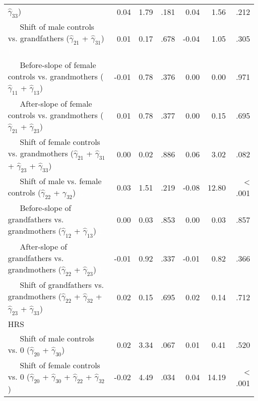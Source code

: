 \documentclass[
  english,
  man, noextraspace]{apa7}
\newenvironment{lltable}{\begin{landscape}\begin{center}\begin{ThreePartTable}}{\end{ThreePartTable}\end{center}\end{landscape}}
\begin{document}
\begin{lltable}
{\begin{longtable}{lrrrrrr}
                              $\hat{\gamma}_{33}$) \textcolor{white}{L} & 0.04 & 1.79 & .181 & 0.04 & 1.56 & .212\\
\ \ \ Shift of male controls vs. grandfathers 
                              ($\hat{\gamma}_{21}$ + $\hat{\gamma}_{31}$) \textcolor{white}{L} & 0.01 & 0.17 & .678 & -0.04 & 1.05 & .305\\
\ \ \ Before-slope of female controls vs. grandmothers 
                              ($\hat{\gamma}_{11}$ + $\hat{\gamma}_{13}$) \textcolor{white}{L} & -0.01 & 0.78 & .376 & 0.00 & 0.00 & .971\\
\ \ \ After-slope of female controls vs. grandmothers 
                              ($\hat{\gamma}_{21}$ + $\hat{\gamma}_{23}$) \textcolor{white}{L} & 0.01 & 0.78 & .377 & 0.00 & 0.15 & .695\\
\ \ \ Shift of female controls vs. grandmothers 
                              ($\hat{\gamma}_{21}$ + $\hat{\gamma}_{31}$ + 
                              $\hat{\gamma}_{23}$ + $\hat{\gamma}_{33}$) \textcolor{white}{L} & 0.00 & 0.02 & .886 & 0.06 & 3.02 & .082\\
\ \ \ Shift of male vs. female controls 
                              ($\hat{\gamma}_{22}$ + $\hat{\gamma}_{32}$) \textcolor{white}{L} & 0.03 & 1.51 & .219 & -0.08 & 12.80 & < .001\\
\ \ \ Before-slope of grandfathers vs. grandmothers 
                              ($\hat{\gamma}_{12}$ + $\hat{\gamma}_{13}$) \textcolor{white}{L} & 0.00 & 0.03 & .853 & 0.00 & 0.03 & .857\\
\ \ \ After-slope of grandfathers vs. grandmothers 
                              ($\hat{\gamma}_{22}$ + $\hat{\gamma}_{23}$) \textcolor{white}{L} & -0.01 & 0.92 & .337 & -0.01 & 0.82 & .366\\
\ \ \ Shift of grandfathers vs. grandmothers 
                              ($\hat{\gamma}_{22}$ + $\hat{\gamma}_{32}$ + 
                              $\hat{\gamma}_{23}$ + $\hat{\gamma}_{33}$) \textcolor{white}{L} & 0.02 & 0.15 & .695 & 0.02 & 0.14 & .712\\
HRS &  &  &  &  &  & \\
\ \ \ Shift of male controls vs. 0 ($\hat{\gamma}_{20}$ + 
                              $\hat{\gamma}_{30}$) \textcolor{white}{H} & 0.02 & 3.34 & .067 & 0.01 & 0.41 & .520\\
\ \ \ Shift of female controls vs. 0 ($\hat{\gamma}_{20}$ + 
                              $\hat{\gamma}_{30}$ + $\hat{\gamma}_{22}$ + 
                              $\hat{\gamma}_{32}$) \textcolor{white}{H} & -0.02 & 4.49 & .034 & 0.04 & 14.19 & < .001\\

\end{longtable}}
\end{lltable}
\end{document}
